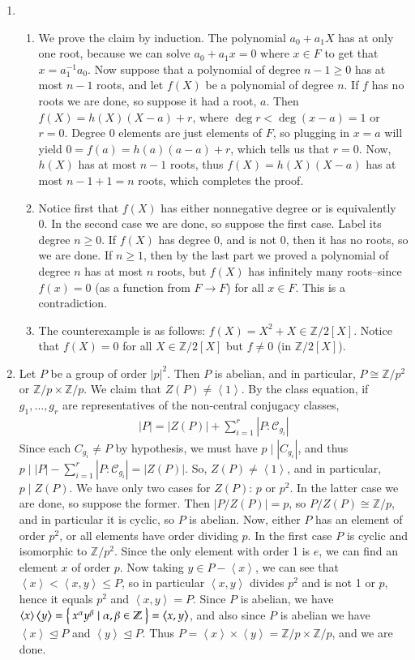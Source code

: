 \documentclass[12pt]{article}
\theoremstyle{definitionstyle}
\def\mbb#1{\mathbb{#1}}
\newcommand{\Z}{\mbb Z}
\newcommand{\gen}[1]{\left\langle #1 \right\rangle}
\newcommand{\nsg}{\trianglelefteq}
\begin{document}
\begin{enumerate}[leftmargin=\labelsep]
		\item \begin{enumerate}
			\item We prove the claim by induction. The polynomial $a_0+a_1X$ has at only one root, because we can solve $a_0+a_1x = 0$ where $x \in F$ to get that $x = a_1^{-1}a_0$. Now suppose that a polynomial of degree $n-1 \geq 0$ has at most $n-1$ roots, and let $f(X)$ be a polynomial of degree $n$. If $f$ has no roots we are done, so suppose it had a root, $a$. Then $f(X) = h(X)(X-a) + r$, where $\deg r < \deg(x-a) = 1$ or $r = 0$. Degree 0 elements are just elements of $F$, so plugging in $x = a$ will yield $0 = f(a) = h(a)(a-a) + r$, which tells us that $r = 0$. Now, $h(X)$ has at most $n-1$ roots, thus $f(X) = h(X)(X-a)$ has at most $n-1+1 = n$ roots, which completes the proof. 
			
			\item Notice first that $f(X)$ has either nonnegative degree or is equivalently 0. In the second case we are done, so suppose the first case. Label its degree $n \geq 0$. If $f(X)$ has degree 0, and is not 0, then it has no roots, so we are done. If $n \geq 1$, then by the last part we proved a polynomial of degree $n$ has at most $n$ roots, but $f(X)$ has infinitely many roots--since $f(x) = 0$ (as a function from $F \to F$) for all $x \in F$. This is a contradiction.
			
			\item The counterexample is as follows: $f(X) = X^2 + X \in \Z/2[X]$. Notice that $f(X) = 0$ for all $X \in \Z/2[X]$ but $f \neq 0$ (in $\Z/2[X]$).
		\end{enumerate}
	
		\newpage
		\item Let $P$ be a group of order $|p|^2$. Then $P$ is abelian, and in particular, $P \cong \Z/p^2$ or $\Z/p \times \Z/p$. We claim that $Z(P) \neq \gen{1}$. By the class equation, if $g_1, \ldots, g_r$ are representatives of the non-central conjugacy classes,
		\begin{align*}
			|P| = |Z(P)| + \sum_{i=1}^r |P : \mathcal{C}_{g_i}|
		\end{align*}
		Since each $C_{g_i} \neq P$ by hypothesis, we must have $p \mid |C_{g_i}|$, and thus $p \mid |P| - \sum_{i=1}^r |P : \mathcal{C}_{g_i}| = |Z(P)|$. So, $Z(P) \neq \gen{1}$, and in particular, $p \mid Z(P)$. We have only two cases for $Z(P)$: $p$ or $p^2$. In the latter case we are done, so suppose the former. Then $|P/Z(P)| = p$, so $P/Z(P) \cong \Z/p$, and in particular it is cyclic, so $P$ is abelian. Now, either $P$ has an element of order $p^2$, or all elements have order dividing $p$. In the first case $P$ is cyclic and isomorphic to $\Z/p^2$. Since the only element with order 1 is $e$, we can find an element $x$ of order $p$. Now taking $y \in P - \gen{x}$, we can see that $\gen{x} < \gen{x, y} \leq P$, so in particular $\gen{x, y}$ divides $p^2$ and is not 1 or $p$, hence it equals $p^2$ and $\gen{x,y} = P$. Since $P$ is abelian, we have $\gen{x} \gen{y} = \Set{x^\alpha y^\beta \mid \alpha,\beta \in \Z} = \gen{x, y}$, and also since $P$ is abelian we have $\gen{x} \nsg P$ and $\gen{y} \nsg P$. Thus $P = \gen{x} \times \gen{y} = \Z/p \times \Z/p$, and we are done.
	\end{enumerate}
\end{document}
